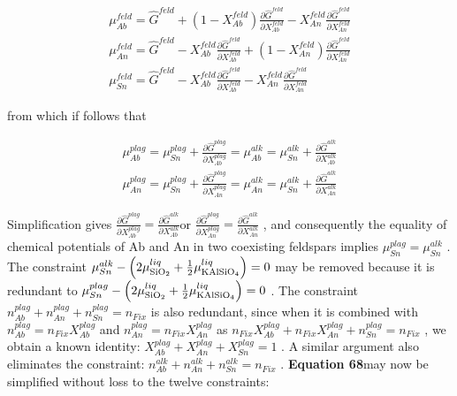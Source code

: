 \documentclass[11pt, titlepage, twoside]{article}
\begin{document}
\begin{MPEquation}[!ht]
\begin{equation}
\begin{array}{l}
\mu _{Ab}^{feld} = {{\hat G}^{feld}} + \left( {1 - X_{Ab}^{feld}} \right)\frac{{\partial {{\hat G}^{feld}}}}{{\partial X_{Ab}^{feld}}} - X_{An}^{feld}\frac{{\partial {{\hat G}^{feld}}}}{{\partial X_{An}^{feld}}}\\
\mu _{An}^{feld} = {{\hat G}^{feld}} - X_{Ab}^{feld}\frac{{\partial {{\hat G}^{feld}}}}{{\partial X_{Ab}^{feld}}} + \left( {1 - X_{An}^{feld}} \right)\frac{{\partial {{\hat G}^{feld}}}}{{\partial X_{An}^{feld}}}\\
\mu _{Sn}^{feld} = {{\hat G}^{feld}} - X_{Ab}^{feld}\frac{{\partial {{\hat G}^{feld}}}}{{\partial X_{Ab}^{feld}}} - X_{An}^{feld}\frac{{\partial {{\hat G}^{feld}}}}{{\partial X_{An}^{feld}}}
\end{array}
\end{equation}
\label{MPEquationElement:99D765E1-DB48-4490-D3E1-3E412DCEFE63}
\end{MPEquation}
from which if follows that


\begin{MPEquation}[!ht]
\begin{equation}
\begin{array}{l}
\mu _{Ab}^{plag} = \mu _{Sn}^{plag} + \frac{{\partial {{\hat G}^{plag}}}}{{\partial X_{Ab}^{plag}}} = \mu _{Ab}^{alk} = \mu _{Sn}^{alk} + \frac{{\partial {{\hat G}^{alk}}}}{{\partial X_{Ab}^{alk}}}\\
\mu _{An}^{plag} = \mu _{Sn}^{plag} + \frac{{\partial {{\hat G}^{plag}}}}{{\partial X_{An}^{plag}}} = \mu _{An}^{alk} = \mu _{Sn}^{alk} + \frac{{\partial {{\hat G}^{alk}}}}{{\partial X_{An}^{alk}}}
\end{array}
\end{equation}
\label{MPEquationElement:5DD68DB2-D8A1-44CF-CD94-A1A046C0A7AC}
\end{MPEquation}
Simplification gives $\frac{{\partial {{\hat G}^{plag}}}}{{\partial X_{Ab}^{plag}}} = \frac{{\partial {{\hat G}^{alk}}}}{{\partial X_{Ab}^{alk}}}$or $\frac{{\partial {{\hat G}^{plag}}}}{{\partial X_{An}^{plag}}} = \frac{{\partial {{\hat G}^{alk}}}}{{\partial X_{An}^{alk}}}$ , and consequently the equality of chemical potentials of Ab and An in two coexisting feldspars implies $\mu _{Sn}^{plag} = \mu _{Sn}^{alk}$ . The constraint $\mu _{Sn}^{alk} - \left( {2\mu _{{\rm{Si}}{{\rm{O}}_2}}^{liq} + \frac{1}{2}\mu _{{\rm{KAlSi}}{{\rm{O}}_4}}^{liq}} \right) = 0$ may be removed because it is redundant to $\mu _{Sn}^{plag} - \left( {2\mu _{{\rm{Si}}{{\rm{O}}_2}}^{liq} + \frac{1}{2}\mu _{{\rm{KAlSi}}{{\rm{O}}_4}}^{liq}} \right) = 0$ . The constraint $n_{Ab}^{plag} + n_{An}^{plag} + n_{Sn}^{plag} = {n_{Fix}}$ is also redundant, since when it is combined with $n_{Ab}^{plag} = {n_{Fix}}X_{Ab}^{plag}$ and $n_{An}^{plag} = {n_{Fix}}X_{An}^{plag}$ as ${n_{Fix}}X_{Ab}^{plag} + {n_{Fix}}X_{An}^{plag} + n_{Sn}^{plag} = {n_{Fix}}$ , we obtain a known identity: $X_{Ab}^{plag} + X_{An}^{plag} + X_{Sn}^{plag} = 1$ . A similar argument also eliminates the constraint: $n_{Ab}^{alk} + n_{An}^{alk} + n_{Sn}^{alk} = {n_{Fix}}$ . \textbf{Equation 68}may now be simplified without loss to the twelve constraints:
\end{document}
